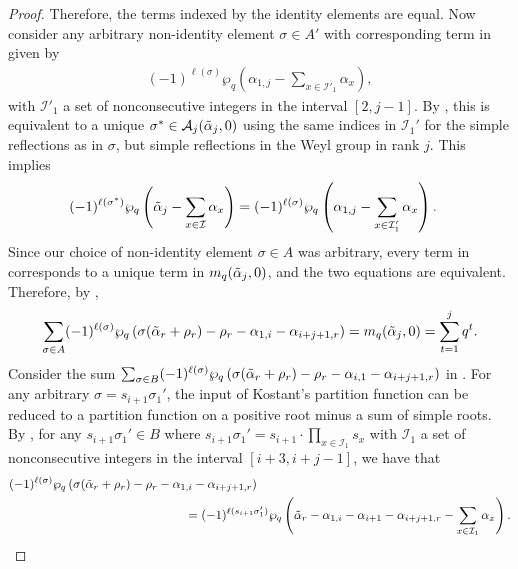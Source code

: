 \documentclass[10pt]{article}
\newcommand{\hr}[0]{\Tilde{\alpha}}
\newcommand{\qpartition}[1]{\wp_q\left(#1\right)}
\begin{document}
\begin{proof}
    Therefore, the terms indexed by the identity elements are equal.
    Now consider any arbitrary non-identity element $\sigma\in A'$ 
    with corresponding term in  given by
    \begin{align}
        (-1)^{\ell(\sigma)}\qpartition{\alpha_{1,j}-\sum_{x\in\mathcal{I}'_1}\alpha_x},\label{phase 1 turn into rank j result}
    \end{align}
    with $\mathcal{I}'_1$ a set of nonconsecutive integers in the interval $[2,j-1]$.  
    By , this is equivalent to a unique  $\sigma^*\in\mathcal{A}_j(\hr_j,0)$ using the same indices in $\mathcal{I}_1'$ for the simple reflections as in $\sigma$, but simple reflections in the Weyl group in rank $j$. This implies
    \begin{align}
        (-1)^{\ell(\sigma^*)}\qpartition{\hr_j-\sum_{x\in\mathcal{I}}\alpha_x} &= (-1)^{\ell(\sigma)}\qpartition{\alpha_{1,j}-\sum_{x\in\mathcal{I}'_1}\alpha_x}.\notag
    \end{align}
    Since our choice of non-identity element $\sigma\in A$ was arbitrary, every term in  
    corresponds to a unique term in $m_q(\hr_j,0)$, and the two equations are equivalent. 
    Therefore, by ,
    \begin{equation}
        \sum_{\sigma\in A}(-1)^{\ell(\sigma)}\qpartition{\sigma(\hr_r+\rho_r)-\rho_r-\alpha_{1,i}-\alpha_{i+j+1,r}} = m_q(\hr_j,0) = \sum_{t=1}^j q^t. \label{DIFF OF EQS SUM 1}
    \end{equation} 
    Consider the sum $\sum_{\sigma\in B}(-1)^{\ell(\sigma)}\qpartition{\sigma(\hr_r+\rho_r)-\rho_r-\alpha_{i,1}-\alpha_{i+j+1,r}}$ in .
    For any arbitrary $\sigma=s_{i+1}\sigma_1'$, the input of Kostant's partition function can be reduced to a partition function on a positive root minus a sum of simple roots. By , for any $s_{i+1}\sigma_1'\in B$ where $s_{i+1}\sigma_1'=s_{i+1}\cdot \prod_{x\in\mathcal{I}_1}s_x$ with $\mathcal{I}_1$ a set of nonconsecutive integers in the interval $[i+3,i+j-1]$, we have that
    \begin{align}
        &(-1)^{\ell(\sigma)}\qpartition{\sigma(\hr_r+\rho_r)-\rho_r-\alpha_{1,i}-\alpha_{i+j+1,r}} \notag\\
        &\hspace{5cm}= (-1)^{\ell(s_{i+1}\sigma_1')}\qpartition{\hr_r-\alpha_{1,i}-\alpha_{i+1}-\alpha_{i+j+1,r}-\sum_{x\in\mathcal{I}_1}\alpha_x}.\notag \\

\end{align}
\end{proof}
\end{document}
